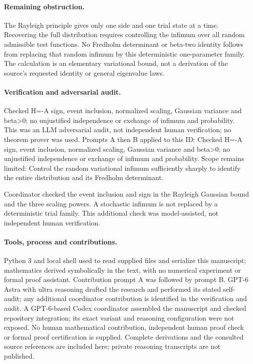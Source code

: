 \documentclass[11pt]{article}
\begin{document}
\paragraph{Remaining obstruction.}The Rayleigh principle gives only one side and one trial state at a time. Recovering the full distribution requires controlling the infimum over all random admissible test functions. No Fredholm determinant or beta-two identity follows from replacing that random infimum by this deterministic one-parameter family. The calculation is an elementary variational bound, not a derivation of the source's requested identity or general eigenvalue laws.

\paragraph{Verification and adversarial audit.}
Checked H=-A sign, event inclusion, normalized scaling, Gaussian variance and beta>0; no unjustified independence or exchange of infimum and probability. This was an LLM adversarial audit, not independent human verification; no theorem prover was used. Prompts A then B applied to this ID: Checked H=-A sign, event inclusion, normalized scaling, Gaussian variance and beta>0; no unjustified independence or exchange of infimum and probability. Scope remains limited: Control the random variational infimum sufficiently sharply to identify the entire distribution and its Fredholm determinant.

Coordinator checked the event inclusion and sign in the Rayleigh Gaussian bound and the three scaling powers. A stochastic infimum is not replaced by a deterministic trial family. This additional check was model-assisted, not independent human verification.

\paragraph{Tools, process and contributions.}
Python 3 and local shell used to read supplied files and serialize this manuscript; mathematics derived symbolically in the text, with no numerical experiment or formal proof assistant. Contribution prompt A was followed by prompt B. GPT-6 Astra with ultra reasoning drafted the research and performed its stated self-audit; any additional coordinator contribution is identified in the verification and audit. A GPT-6-based Codex coordinator assembled the manuscript and checked repository integration; its exact variant and reasoning configuration were not exposed. No human mathematical contribution, independent human proof check or formal proof certification is supplied. Complete derivations and the consulted source references are included here; private reasoning transcripts are not published.
\end{document}
